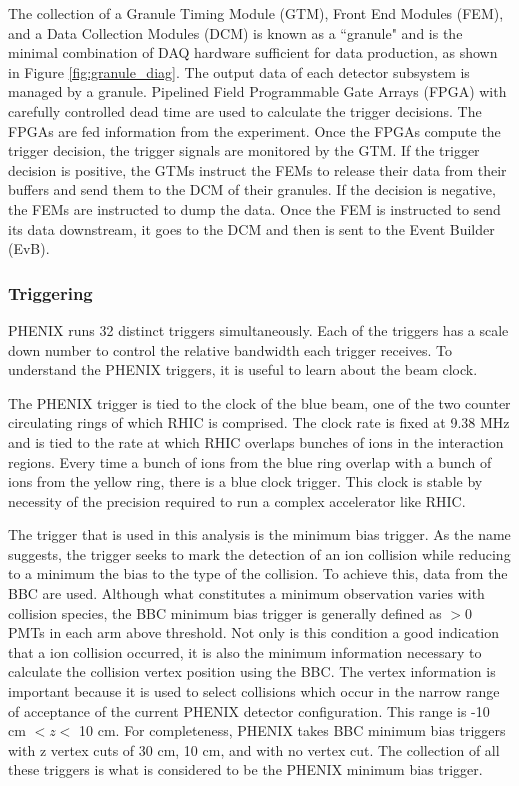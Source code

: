 The collection of a  Granule Timing Module (GTM), Front End Modules (FEM), and a Data Collection Modules (DCM) is known as a ``granule" and is the minimal combination of DAQ hardware sufficient for data production, as shown in Figure \ref{fig:granule_diag}. The output data of each detector subsystem is managed by a granule. Pipelined Field Programmable Gate Arrays (FPGA) with carefully controlled dead time are used to calculate the trigger decisions. The FPGAs are fed information from the experiment. Once the FPGAs compute the trigger decision, the trigger signals are monitored by the GTM. If the trigger decision is positive, the GTMs instruct the FEMs to release their data from their buffers and send them to the DCM of their granules. If the decision is negative, the FEMs are instructed to dump the data.  Once the FEM is instructed to send its data downstream, it goes to the DCM and then is sent to the Event Builder (EvB).

\subsubsection{Triggering}
PHENIX runs 32 distinct triggers simultaneously. Each of the triggers has a scale down number to control the relative bandwidth each trigger receives. To understand the PHENIX triggers, it is useful to learn about the beam clock.

The PHENIX trigger is tied to the clock of the blue beam, one of the two counter circulating rings of which RHIC is comprised. The clock rate is fixed at 9.38 MHz and is tied to the rate at which RHIC overlaps bunches of ions in the interaction regions. Every time a bunch of ions from the blue ring overlap with a bunch of ions from the yellow ring, there is a blue clock trigger. This clock is stable by necessity of the precision required to run a complex accelerator like RHIC.

The trigger that is used in this analysis is the minimum bias trigger. As the name suggests, the trigger seeks to mark the detection of an ion collision while reducing to a minimum the bias to the type of the collision. To achieve this, data from the BBC are used. Although what constitutes a minimum observation varies with collision species, the BBC minimum bias trigger is generally defined as $>$0 PMTs in each arm above threshold. Not only is this condition a good indication that a ion collision occurred, it is also the minimum information necessary to calculate the collision vertex position using the BBC. The vertex information is important because it is used to select collisions which occur in the narrow range of acceptance of the current PHENIX detector configuration. This range is -10 cm $< z<$ 10 cm. For completeness, PHENIX takes BBC minimum bias triggers with z vertex cuts of 30 cm, 10 cm, and with no vertex cut. The collection of all these triggers is what is considered to be the PHENIX minimum bias trigger.


